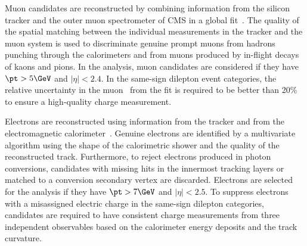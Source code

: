 Muon candidates are reconstructed by combining information from the silicon tracker and the outer muon spectrometer of CMS in a global fit~\cite{Chatrchyan:2012xi}.
The quality of the spatial matching between the individual measurements in the tracker and the muon system is used to discriminate genuine prompt muons from hadrons punching through the calorimeters and from muons produced by in-flight decays of kaons and pions.
In the analysis, muon candidates are considered if they have $\pt>5\GeV$ and $|\eta|<2.4$.
In the same-sign dilepton event categories, the relative uncertainty in the muon \pt\ from the fit is required to be better than 20\% to ensure a high-quality charge measurement.

Electrons are reconstructed using information from the tracker and from the electromagnetic calorimeter~\cite{Khachatryan:2015hwa}.
Genuine electrons are identified by a multivariate algorithm using the shape of the calorimetric shower and the quality of the reconstructed track.
Furthermore, to reject electrons produced in photon conversions, candidates with missing hits in the innermost tracking layers or matched to a conversion secondary vertex are discarded.
Electrons are selected for the analysis if they have $\pt>7\GeV$ and $|\eta|<2.5$.
To suppress electrons with a misassigned electric charge in the same-sign dilepton categories, candidates are required to have consistent charge measurements from three independent observables based on the calorimeter energy deposits and the track curvature.

